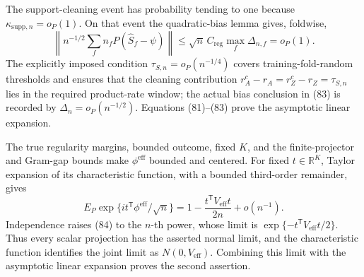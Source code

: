 The support-cleaning event has probability tending to one because \(\kappa_{\mathrm{supp},n}=o_P(1)\).  On that event the quadratic-bias lemma gives, foldwise,
\[
 \left\|n^{-1/2}\sum_fn_fP(\widehat S_f-\psi)\right\|
 \leq\sqrt n\,C_{\mathrm{reg}}\max_f\Delta_{n,f}=o_P(1).       \tag{83}
\]
The explicitly imposed condition \(\tau_{S,n}=o_P(n^{-1/4})\) covers training-fold-random thresholds and ensures that the cleaning contribution \(r_A^c-r_A=r_Z^c-r_Z=\tau_{S,n}\) lies in the required product-rate window; the actual bias conclusion in (83) is recorded by \(\Delta_n=o_P(n^{-1/2})\).  Equations (81)--(83) prove the asymptotic linear expansion.

The true regularity margins, bounded outcome, fixed \(K\), and the finite-projector and Gram-gap bounds make \(\phi^{\mathrm{eff}}\) bounded and centered.  For fixed \(t\in\mathbb R^K\), Taylor expansion of its characteristic function, with a bounded third-order remainder, gives
\[
 E_P\exp\{it^{\mathsf T}\phi^{\mathrm{eff}}/\sqrt n\}
 =1-\frac{t^{\mathsf T}V_{\mathrm{eff}}t}{2n}+o(n^{-1}).       \tag{84}
\]
Independence raises (84) to the \(n\)-th power, whose limit is
\(\exp\{-t^{\mathsf T}V_{\mathrm{eff}}t/2\}\).  Thus every scalar projection has the asserted normal limit, and the characteristic function identifies the joint limit as \(N(0,V_{\mathrm{eff}})\).  Combining this limit with the asymptotic linear expansion proves the second assertion.

